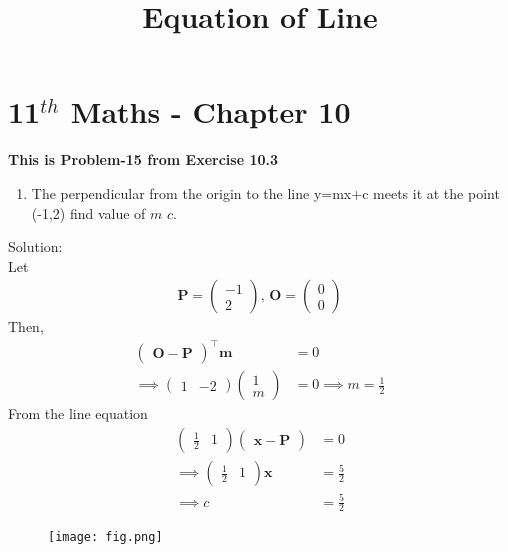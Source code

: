 \documentclass[journel,12pt,twocolumn]{article}
\newcommand{\myvec}[1]{\ensuremath{\begin{pmatrix}#1\end{pmatrix}}}
\let\vec\mathbf
\begin{document}
\begin{center}
\title{\textbf{Equation of Line}}
\date{\vspace{-5ex}} %
\maketitle
\end{center}
\section{11$^{th}$ Maths - Chapter 10}
\textbf{This is Problem-15 from Exercise 10.3}
\begin{enumerate}
\item The perpendicular from the origin to the line y=mx+c meets it at the point (-1,2) find value of $m$ $c$.
\end{enumerate}
Solution:
\\
\fi
Let
\begin{align}
\vec{P}=\myvec{-1\\2},\,
\vec{O}=\myvec{0\\0}
\end{align}
Then, 
\begin{align}
\myvec{\vec{O}-\vec{P}}^{\top}\vec{m}&=0\\
\implies\myvec{1&-2}\myvec{1\\m}&=0
\implies m=\frac{1}{2}
\end{align}
From the line equation 
\begin{align}
\myvec{\frac{1}{2}&1}\myvec{\vec{x}-\vec{P}}&=0\\
\implies\myvec{\frac{1}{2}&1}\vec{x}&=\frac{5}{2}\\
\implies c&=\frac{5}{2}
\end{align}
\begin{figure}[!h]
\centering
\texttt{[image: fig.png]}
\caption{}
  \label{fig:Figure}
\end{figure}
\end{document}
